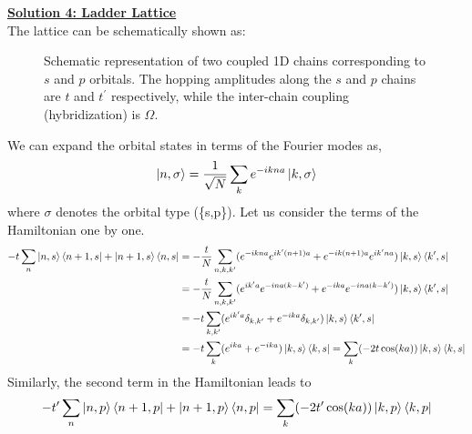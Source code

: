 \documentclass[usenames, svgnames, dvipsnames]{scrartcl}
\begin{document}
    
   
\noindent 
\noindent
\underline{\textbf{{\sffamily Solution 4: Ladder Lattice}}}
\\[0.3cm]
The lattice can be schematically shown as: 
     \begin{figure}[H]
        \centering
    
    \caption{Schematic representation of two coupled 1D chains corresponding to \(s\) and \(p\) orbitals. The hopping amplitudes along the \(s\) and \(p\) chains are \(t\) and \(t^{\prime}\) respectively, while the inter-chain coupling (hybridization) is \(\Omega\).
}
\end{figure} 
\noindent 
We can expand the orbital states in terms of the Fourier modes as, 
$$\ket{n,\sigma} = \frac{1}{\sqrt{N}}\sum\limits_{k} e^{-ikna}\ket{k,\sigma}$$
where $\sigma$ denotes the orbital type (\sigma \in \{s,p\}). Let us consider the terms of the Hamiltonian one by one.   
\begin{align*}
    -t \sum\limits_{n} \ket{n,s}\bra{n+1,s} + \ket{n+1,s}\bra{n,s} &= -\frac{t}{N}\sum\limits_{n,k,k'} (e^{-ikna} e^{ik'(n+1)a} + e^{-ik(n+1)a}e^{ik'na}) \ket{k,s}\bra{k',s}\\
    &=-\frac{t}{N}\sum\limits_{n,k,k'} (e^{ik'a} e^{-ina(k-k')} + e^{-ika}e^{-ina(k-k')}) \ket{k,s}\bra{k',s}\\
    &=-t \sum\limits_{k,k'} (e^{ik'a} \delta_{k,k'} + e^{-ika}\delta_{k,k'}) \ket{k,s}\bra{k',s}\\
     &=-t \sum\limits_{k} (e^{ika}  + e^{-ika}) \ket{k,s}\bra{k,s} = \sum\limits_{k}(-2t\cos(ka))\ket{k,s}\bra{k,s} 
\end{align*}
Similarly, the second term in the Hamiltonian leads to  
$$-t' \sum\limits_{n} \ket{n,p}\bra{n+1,p} + \ket{n+1,p}\bra{n,p} = \sum\limits_{k}(-2t'\cos(ka))\ket{k,p}\bra{k,p}$$
\end{document}
